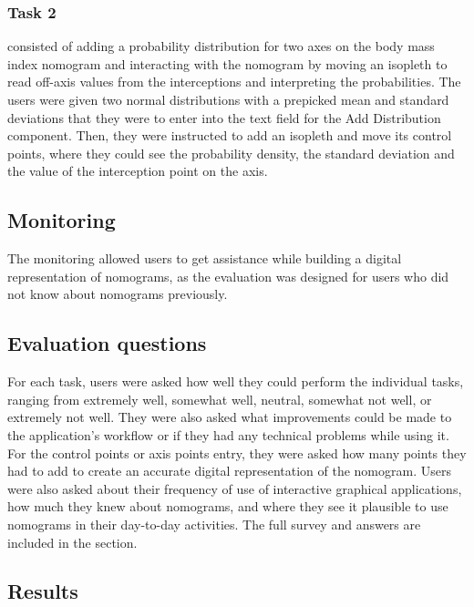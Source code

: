 \documentclass{l4proj}
\begin{document}
\subsubsection{Task 2} consisted of adding a probability distribution for two axes on the body mass index nomogram and interacting with the nomogram by moving an isopleth to read off-axis values from the interceptions and interpreting the probabilities. The users were given two normal distributions with a prepicked mean and standard deviations that they were to enter into the text field for the Add Distribution component. Then, they were instructed to add an isopleth and move its control points, where they could see the probability density, the standard deviation and the value of the interception point on the axis. 

\subsection{Monitoring}

The monitoring allowed users to get assistance while building a digital representation of nomograms, as the evaluation was designed for users who did not know about nomograms previously. 

\subsection{Evaluation questions}
For each task, users were asked how well they could perform the individual tasks, ranging from extremely well, somewhat well, neutral, somewhat not well, or extremely not well. They were also asked what improvements could be made to the application's workflow or if they had any technical problems while using it. For the control points or axis points entry, they were asked how many points they had to add to create an accurate digital representation of the nomogram. Users were also asked about their frequency of use of interactive graphical applications, how much they knew about nomograms, and where they see it plausible to use nomograms in their day-to-day activities. The full survey and answers are included in the  section. 

\subsection{Results}
\end{document}
